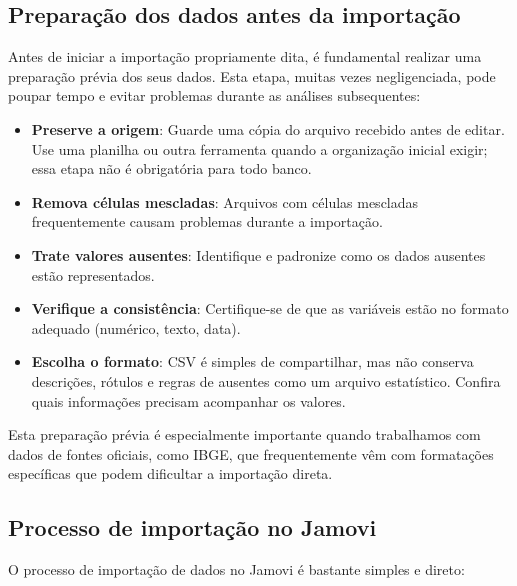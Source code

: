 \subsection{Preparação dos dados antes da importação}

Antes de iniciar a importação propriamente dita, é fundamental realizar uma preparação prévia dos seus dados. Esta etapa, muitas vezes negligenciada, pode poupar tempo e evitar problemas durante as análises subsequentes:

\begin{itemize}
    \item \textbf{Preserve a origem}: Guarde uma cópia do arquivo recebido antes de editar. Use uma planilha ou outra ferramenta quando a organização inicial exigir; essa etapa não é obrigatória para todo banco.
    \item \textbf{Remova células mescladas}: Arquivos com células mescladas frequentemente causam problemas durante a importação.
    \item \textbf{Trate valores ausentes}: Identifique e padronize como os dados ausentes estão representados.
    \item \textbf{Verifique a consistência}: Certifique-se de que as variáveis estão no formato adequado (numérico, texto, data).
    \item \textbf{Escolha o formato}: CSV é simples de compartilhar, mas não conserva descrições, rótulos e regras de ausentes como um arquivo estatístico. Confira quais informações precisam acompanhar os valores.
\end{itemize}

Esta preparação prévia é especialmente importante quando trabalhamos com dados de fontes oficiais, como IBGE, que frequentemente vêm com formatações específicas que podem dificultar a importação direta.

\subsection{Processo de importação no Jamovi}

O processo de importação de dados no Jamovi é bastante simples e direto:

